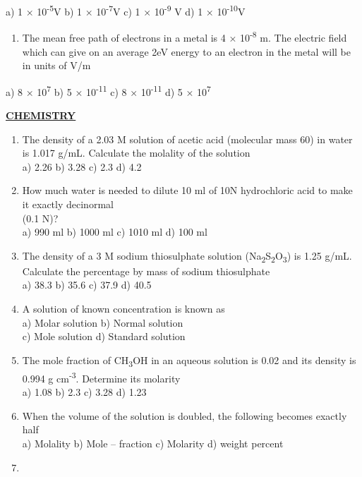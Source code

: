 a) 1 × 10\textsuperscript{-5}V b) 1 × 10\textsuperscript{-7}V c) 1 ×
10\textsuperscript{-9} V d) 1 × 10\textsuperscript{-10}V

\begin{enumerate}
\def\labelenumi{\arabic{enumi}.}
\setcounter{enumi}{43}
\item
  The mean free path of electrons in a metal is 4 ×
  10\textsuperscript{-8} m. The electric field which can give on an
  average 2eV energy to an electron in the metal will be in units of V/m
\end{enumerate}

a) 8 × 10\textsuperscript{7} b) 5 × 10\textsuperscript{-11} c) 8 ×
10\textsuperscript{-11} d) 5 × 10\textsuperscript{7}

\textbf{\ul{CHEMISTRY}}

\begin{enumerate}
\def\labelenumi{\arabic{enumi}.}
\setcounter{enumi}{45}
\item
  The density of a 2.03 M solution of acetic acid (molecular mass 60) in
  water is 1.017 g/mL. Calculate the molality of the solution\\
  a) 2.26 b) 3.28 c) 2.3 d) 4.2
\item
  How much water is needed to dilute 10 ml of 10N hydrochloric acid to
  make it exactly decinormal\\
  (0.1 N)?\\
  a) 990 ml b) 1000 ml c) 1010 ml d) 100 ml
\item
  The density of a 3 M sodium thiosulphate solution
  (Na\textsubscript{2}S\textsubscript{2}O\textsubscript{3}) is 1.25
  g/mL. Calculate the percentage by mass of sodium thiosulphate\\
  a) 38.3 b) 35.6 c) 37.9 d) 40.5
\item
  A solution of known concentration is known as\\
  a) Molar solution b) Normal solution\\
  c) Mole solution d) Standard solution
\item
  The mole fraction of CH\textsubscript{3}OH in an aqueous solution is
  0.02 and its density is 0.994 g cm\textsuperscript{-3}. Determine its
  molarity\\
  a) 1.08 b) 2.3 c) 3.28 d) 1.23
\item
  When the volume of the solution is doubled, the following becomes
  exactly half\\
  a) Molality b) Mole -- fraction c) Molarity d) weight percent
\item

\end{enumerate}
